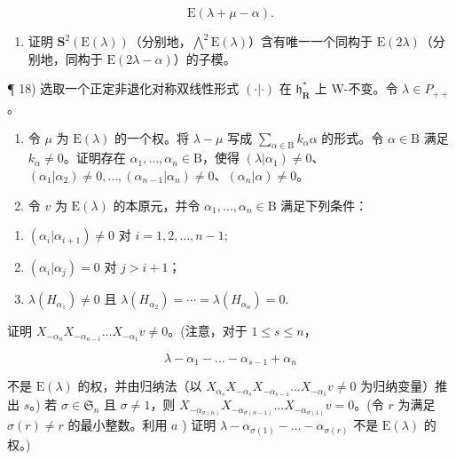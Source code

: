 \[
\mathrm{E} (\lambda + \mu - \alpha).
\]

\begin{enumerate}
\def\labelenumi{\alph{enumi})}
\setcounter{enumi}{3}
\tightlist
\item
  证明 \(\mathbf{S}^{2}(\mathrm{E}(\lambda))\)（分别地，\(\bigwedge^{2}\mathrm{E}(\lambda)\)）含有唯一一个同构于 \(\mathrm{E}(2\lambda)\)（分别地，同构于 \(\mathrm{E}(2\lambda-\alpha)\)）的子模。
\end{enumerate}

¶ 18) 选取一个正定非退化对称双线性形式 \((\cdot|\cdot)\) 在 \(\mathfrak{h}_{\mathbf{R}}^{*}\) 上 W-不变。令 \(\lambda \in P_{++}\)。

\begin{enumerate}
\def\labelenumi{\alph{enumi})}
\item
  令 \(\mu\) 为 \(\mathrm{E}(\lambda)\) 的一个权。将 \(\lambda - \mu\) 写成 \(\sum_{\alpha \in \mathrm{B}} k_{\alpha} \alpha\) 的形式。令 \(\alpha \in \mathrm{B}\) 满足 \(k_{\alpha} \neq 0\)。证明存在 \(\alpha_{1}, \ldots, \alpha_{n} \in \mathrm{B}\)，使得 \((\lambda | \alpha_{1}) \neq 0\)、\((\alpha_{1} | \alpha_{2}) \neq 0, \ldots, (\alpha_{n-1} | \alpha_{n}) \neq 0\)、\((\alpha_{n} | \alpha) \neq 0\)。
\item
  令 \(v\) 为 \(\mathrm{E}(\lambda)\) 的本原元，并令 \(\alpha_1, \ldots, \alpha_n \in \mathrm{B}\) 满足下列条件：
\end{enumerate}

\begin{enumerate}
\def\labelenumi{(\roman{enumi})}
\item
  \((\alpha_{i}|\alpha_{i+1})\neq0\) 对 \(i=1,2,\ldots,n-1;\)
\item
  \((\alpha_{i}|\alpha_{j}) = 0\) 对 \(j > i + 1\)；
\item
  \(\lambda(H_{\alpha_{1}})\neq0\) 且 \(\lambda(H_{\alpha_{2}})=\cdots=\lambda(H_{\alpha_{n}})=0.\)
\end{enumerate}

证明 \(X_{-\alpha_n}X_{-\alpha_{n-1}} \ldots X_{-\alpha_1}v \neq 0\)。(注意，对于 \(1 \leq s \leq n\)，

\[
\lambda - \alpha_ {1} - \dots - \alpha_ {s - 1} + \alpha_ {n}
\]

不是 \(\mathrm{E}(\lambda)\) 的权，并由归纳法（以 \(X_{\alpha_s}X_{-\alpha_s}X_{-\alpha_{s-1}}\ldots X_{-\alpha_1}v\neq 0\) 为归纳变量）推出 \(s\)。) 若 \(\sigma \in \mathfrak{S}_n\) 且 \(\sigma \neq 1\)，则 \(X_{-\alpha_{\sigma(n)}}X_{-\alpha_{\sigma(n-1)}}\ldots X_{-\alpha_{\sigma(1)}}v = 0\)。(令 \(r\) 为满足 \(\sigma(r)\neq r\) 的最小整数。利用 \(a\) ) 证明 \(\lambda -\alpha_{\sigma(1)} - \ldots -\alpha_{\sigma(r)}\) 不是 \(\mathrm{E}(\lambda)\) 的权。)

